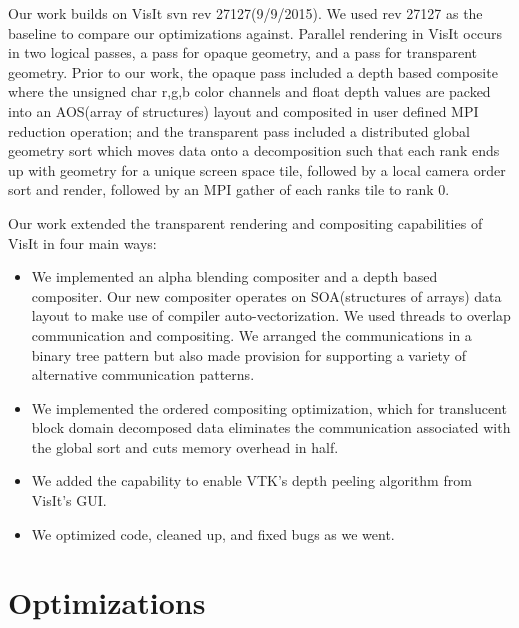 \documentclass[a4paper,10pt]{report}
\begin{document}
Our work builds on VisIt svn rev 27127(9/9/2015). We used rev 27127 as the baseline to compare our optimizations against. Parallel rendering in VisIt occurs in two logical passes, a pass for opaque geometry, and a pass for transparent geometry. Prior to our work, the opaque pass included a depth based composite where the unsigned char r,g,b color channels and float depth values are packed into an AOS(array of structures) layout and composited in user defined MPI reduction operation; and the transparent pass included a distributed global geometry sort which moves data onto a decomposition such that each rank ends up with geometry for a unique screen space tile, followed by a local camera order sort and render, followed by an MPI gather of each ranks tile to rank 0.

Our work extended the transparent rendering and compositing capabilities of VisIt in four main ways: 
\begin{itemize}
 \item We implemented an alpha blending compositer and a depth based compositer. Our new compositer operates on SOA(structures of arrays) data layout to make use of compiler auto-vectorization. We used threads to overlap communication and compositing. We arranged the communications in a binary tree pattern but also made provision for supporting a variety of alternative communication patterns.
 \item We implemented the ordered compositing optimization, which for translucent block domain decomposed data eliminates the communication associated with the global sort and cuts memory overhead in half.
 \item We added the capability to enable VTK's depth peeling algorithm from VisIt's GUI.
 \item We optimized code, cleaned up, and fixed bugs as we went.
\end{itemize}

\section{Optimizations}
\end{document}
